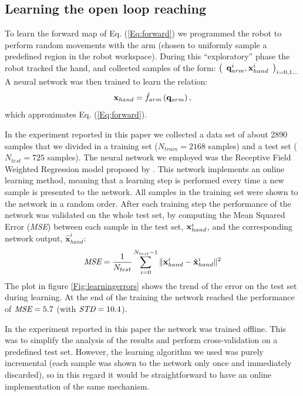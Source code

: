 \subsection{Learning the open loop reaching}
\label{sec:learning-open-loop}
%
To learn the forward map of Eq. (\ref{Eq:forward}) we programmed 
the robot to perform random movements with the arm (chosen to uniformly sample 
a predefined region in the robot workspace). During this ``exploratory'' 
phase the robot tracked the hand, and collected samples of the form: $
%
\left(\begin{array}{cc}
  \qarm^i , \xhand^i\end{array}\right)_{i = 0,1\dots}$
%
A neural network was then trained to learn the relation:
%
\begin{equation} 
  \mathbf{x}_{hand}=\hat{f}_{arm}\left(\mathbf q_{arm} \right),
\end{equation}
%
which approximates Eq. (\ref{Eq:forward}).

In the experiment reported in this paper we collected a data set of 
about 2890 samples that we divided in a training set ($N_{train}=2168$
 samples) and 
a test set ($N_{test}=725$ samples). The neural network we employed was the 
Receptive Field Weighted Regression model proposed 
by \cite{schaal98Constructive}. This network implements an online learning
method, meaning that a learning step is performed every time a new 
sample is presented to the network. All samples in the training set were shown
to the network in a random order. After each training step the 
performance of the network was validated on the whole test set, by computing
the Mean Squared Error (\emph{MSE}) between each sample in the test set, 
$\mathbf{x}_{hand}^i$, and the corresponding network output, 
$\mathbf{\hat{x}}_{hand}^i$:
%
\begin{equation}
\emph{MSE}=\frac{1}{N_{test}}\sum_{i=0}^{N_{test}-1}\|\mathbf{x}_{hand}^i- \hat{\mathbf{x}}_{hand}^i\|^2
\end{equation}
%
The plot in figure \ref{Fig:learningerrors}
shows the trend of the error on the test set during learning. At the end of
the training the network reached the performance of $\emph{MSE}=5.7$ 
(with $\emph{STD}=10.4$).

In the experiment reported in this paper the network was trained offline. 
This was to simplify the analysis of the results and perform cross-validation 
on a predefined test set. However, the learning algorithm we used was purely 
incremental (each sample was shown to the network only once and immediately 
discarded), so in this regard it would be straightforward to have an 
online implementation of the same mechanism.

